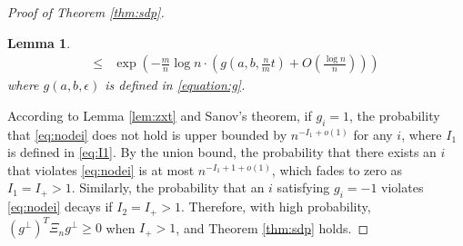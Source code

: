 \documentclass[conference]{IEEEtran}
\newtheorem{lemma}{Lemma}
\newtheorem{corollary}{Corollary}
\DeclareMathOperator{\SDP}{SDP}
\begin{document}
\begin{proof}[Proof of Theorem \ref{thm:sdp}]
\begin{lemma}
\begin{align}
			\leq &\exp(-\frac{m}{n}\log n \cdot ( g(a, b, \frac{n}{m}t) + O(\frac{\log n}{n})))
		\end{align}
		where $g(a,b,\epsilon)$ is defined in \eqref{equation:g}.
	\end{lemma}
	According to Lemma \ref{lem:zxt} and Sanov's theorem, if $g_i=1$, the probability that \eqref{eq:nodei} does not hold is upper bounded by
	$n^{-I_1 + o(1)}$ for any $i$, where $I_1$ is defined in \eqref{eq:I1}. By the union bound, the probability that there exists an $i$ that violates \eqref{eq:nodei} is at most $n^{-I_1+1 + o(1)}$, which fades to zero as $I_1=I_+>1$. 
	Similarly, the probability that an $i$ satisfying $g_i=-1$ violates \eqref{eq:nodei} decays if $I_2=I_+>1$. Therefore, with high probability, $(g^{\perp})^T \Xi_n g^{\perp}\ge0$ when $I_+>1$, and Theorem \ref{thm:sdp} holds. 
\end{proof}
\end{document}
